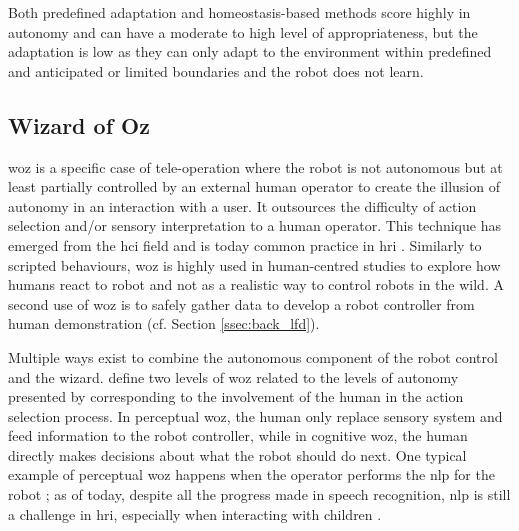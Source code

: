 	
	Both predefined adaptation and homeostasis-based methods score highly in autonomy and can have a moderate to high level of appropriateness, but the adaptation is low as they can only adapt to the environment within predefined and anticipated or limited boundaries and the robot does not learn.

\subsection{Wizard of Oz} \label{subsec:WoZ}

	\acrfull{woz} is a specific case of tele-operation where the robot is not autonomous but at least partially controlled by an external human operator to create the illusion of autonomy in an interaction with a user. It outsources the difficulty of action selection and/or sensory interpretation to a human operator. This technique has emerged from the \gls{hci} field \citep{kelley1983empirical} and is today common practice in \gls{hri} \citep{riek2012wizard}. Similarly to scripted behaviours, \gls{woz} is highly used in human-centred studies to explore how humans react to robot and not as a realistic way to control robots in the wild. A second use of \gls{woz} is to safely gather data to develop a robot controller from human demonstration (cf. Section \ref{ssec:back_lfd}).
	
	Multiple ways exist to combine the autonomous component of the robot control and the wizard. \cite{baxter2016characterising} define two levels of \gls{woz} related to the levels of autonomy presented by \cite{beer2014toward} corresponding to the involvement of the human in the action selection process. In perceptual \gls{woz}, the human only replace sensory system and feed information to the robot controller, while in cognitive \gls{woz}, the human directly makes decisions about what the robot should do next. One typical example of perceptual \gls{woz} happens when the operator performs the \gls{nlp} for the robot \citep{cakmak2010designing}; as of today, despite all the progress made in speech recognition, \gls{nlp} is still a challenge in \gls{hri}, especially when interacting with children \citep{kennedy2017child}.
	
